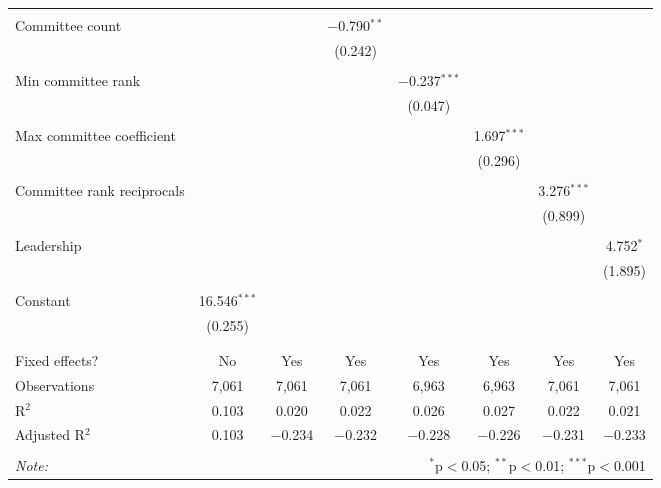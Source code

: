 \documentclass{article}
\begin{document}
\begin{table}[!htbp]
{{\begin{tabular}{@{\extracolsep{5pt}}lccccccc}
          & & & & & & & \\ 
         Committee count &  &  & $-$0.790$^{**}$ &  &  &  &  \\ 
          &  &  & (0.242) &  &  &  &  \\ 
          & & & & & & & \\ 
         Min committee rank &  &  &  & $-$0.237$^{***}$ &  &  &  \\ 
          &  &  &  & (0.047) &  &  &  \\ 
          & & & & & & & \\ 
         Max committee coefficient &  &  &  &  & 1.697$^{***}$ &  &  \\ 
          &  &  &  &  & (0.296) &  &  \\ 
          & & & & & & & \\ 
         Committee rank reciprocals &  &  &  &  &  & 3.276$^{***}$ &  \\ 
          &  &  &  &  &  & (0.899) &  \\ 
          & & & & & & & \\ 
         Leadership &  &  &  &  &  &  & 4.752$^{*}$ \\ 
          &  &  &  &  &  &  & (1.895) \\ 
          & & & & & & & \\ 
         Constant & 16.546$^{***}$ &  &  &  &  &  &  \\ 
          & (0.255) &  &  &  &  &  &  \\ 
          & & & & & & & \\ 
        \hline \\[-1.8ex] 
        Fixed effects? & No & Yes & Yes & Yes & Yes & Yes & Yes \\ 
        Observations & 7,061 & 7,061 & 7,061 & 6,963 & 6,963 & 7,061 & 7,061 \\ 
        R$^{2}$ & 0.103 & 0.020 & 0.022 & 0.026 & 0.027 & 0.022 & 0.021 \\ 
        Adjusted R$^{2}$ & 0.103 & $-$0.234 & $-$0.232 & $-$0.228 & $-$0.226 & $-$0.231 & $-$0.233 \\ 
        \hline 
        \hline \\[-1.8ex] 
        \textit{Note:}  & \multicolumn{7}{r}{$^{*}$p$<$0.05; $^{**}$p$<$0.01; $^{***}$p$<$0.001} \\ 
        \end{tabular} 
    }}
  \end{table} 


\nocite{stargazer}

\pagebreak
\printbibliography
\end{document}
